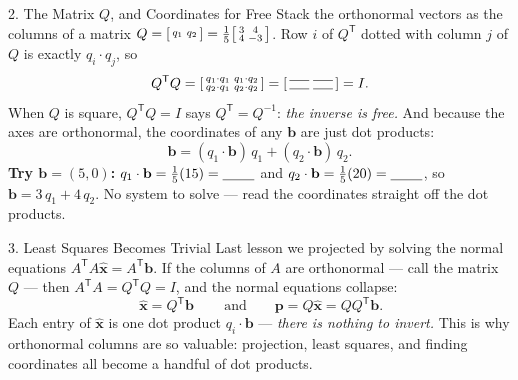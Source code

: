 \documentclass[10pt]{article}
\newcommand{\xx}{\mathbf{x}}
\newcommand{\bb}{\mathbf{b}}
\newcommand{\pp}{\mathbf{p}}
\newcommand{\T}{\mathsf{T}}
\begin{document}
\begin{notesbox}{2. The Matrix $Q$, and Coordinates for Free}
Stack the orthonormal vectors as the columns of a matrix $Q=\begin{bsmallmatrix} q_1 & q_2 \end{bsmallmatrix}
=\tfrac15\begin{bsmallmatrix} 3 & 4\\ 4 & -3 \end{bsmallmatrix}$. Row $i$ of $Q^{\T}$ dotted with column $j$
of $Q$ is exactly $q_i\cdot q_j$, so
\[
  Q^{\T}Q=\begin{bsmallmatrix} q_1\cdot q_1 & q_1\cdot q_2\\ q_2\cdot q_1 & q_2\cdot q_2 \end{bsmallmatrix}
  =\begin{bsmallmatrix} \blank{0.5cm} & \blank{0.5cm}\\ \blank{0.5cm} & \blank{0.5cm} \end{bsmallmatrix}=I.
\]
When $Q$ is square, $Q^{\T}Q=I$ says $Q^{\T}=Q^{-1}$: \emph{the inverse is free.} And because the axes are
orthonormal, the coordinates of any $\bb$ are just dot products:
\[
  \bb=(q_1\cdot\bb)\,q_1+(q_2\cdot\bb)\,q_2.
\]
\textbf{Try $\bb=(5,0)$:} $q_1\cdot\bb=\tfrac15(15)=\blank{0.8cm}$ and $q_2\cdot\bb=\tfrac15(20)=\blank{0.8cm}$,
so $\bb=3\,q_1+4\,q_2$. No system to solve --- read the coordinates straight off the dot products.
\end{notesbox}

\begin{notesbox}{3. Least Squares Becomes Trivial}
Last lesson we projected by solving the normal equations $A^{\T}A\hat{\xx}=A^{\T}\bb$. If the columns of $A$
are orthonormal --- call the matrix $Q$ --- then $A^{\T}A=Q^{\T}Q=I$, and the normal equations collapse:
\[
  \boxed{\,\hat{\xx}=Q^{\T}\bb\,}\qquad\text{and}\qquad \pp=Q\hat{\xx}=QQ^{\T}\bb.
\]
Each entry of $\hat{\xx}$ is one dot product $q_i\cdot\bb$ --- \emph{there is nothing to invert.} This is why
orthonormal columns are so valuable: projection, least squares, and finding coordinates all become a handful
of dot products.
\end{notesbox}
\end{document}
